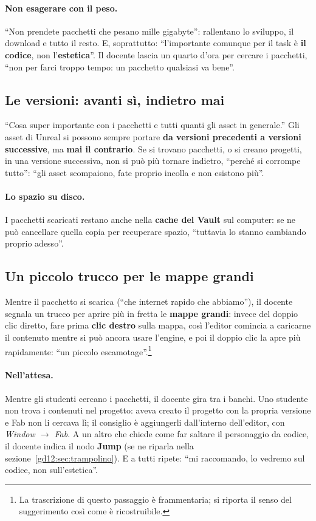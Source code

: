 \paragraph{Non esagerare con il peso.} ``Non prendete pacchetti che pesano mille
gigabyte'': rallentano lo sviluppo, il download e tutto il resto. E, soprattutto:
``l'importante comunque per il task è \textbf{il codice}, non
l'\textbf{estetica}''. Il docente lascia un quarto d'ora per cercare i
pacchetti, ``non per farci troppo tempo: un pacchetto qualsiasi va bene''.

\subsection{Le versioni: avanti sì, indietro mai}

``Cosa super importante con i pacchetti e tutti quanti gli asset in generale.''
Gli asset di Unreal si possono sempre portare \textbf{da versioni precedenti a
versioni successive}, ma \textbf{mai il contrario}. Se si trovano pacchetti, o
si creano progetti, in una versione successiva, non si può più tornare indietro,
``perché si corrompe tutto'': ``gli asset scompaiono, fate proprio incolla e non
esistono più''.

\paragraph{Lo spazio su disco.} I pacchetti scaricati restano anche nella
\textbf{cache del Vault} sul computer: se ne può cancellare quella copia per
recuperare spazio, ``tuttavia lo stanno cambiando proprio adesso''.

\subsection{Un piccolo trucco per le mappe grandi}

Mentre il pacchetto si scarica (``che internet rapido che abbiamo''), il docente
segnala un trucco per aprire più in fretta le \textbf{mappe grandi}: invece del
doppio clic diretto, fare prima \textbf{clic destro} sulla mappa, così l'editor
comincia a caricarne il contenuto mentre si può ancora usare l'engine, e poi il
doppio clic la apre più rapidamente: ``un piccolo escamotage''.\footnote{La
trascrizione di questo passaggio è frammentaria; si riporta il senso del
suggerimento così come è ricostruibile.}

\paragraph{Nell'attesa.} Mentre gli studenti cercano i pacchetti, il docente
gira tra i banchi. Uno studente non trova i contenuti nel progetto: aveva creato
il progetto con la propria versione e Fab non li cercava lì; il consiglio è
aggiungerli dall'interno dell'editor, con \emph{Window $\rightarrow$ Fab}. A un
altro che chiede come far saltare il personaggio da codice, il docente indica il
nodo \textbf{Jump} (se ne riparla nella sezione~\ref{gd12:sec:trampolino}). E a
tutti ripete: ``mi raccomando, lo vedremo sul codice, non sull'estetica''.

